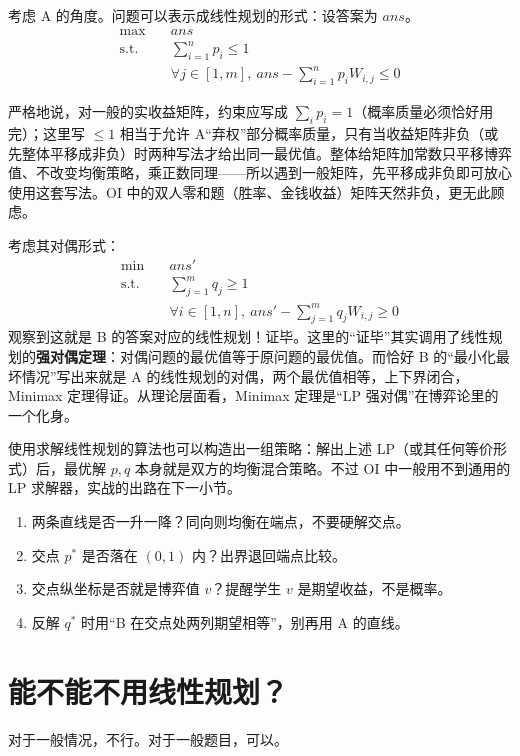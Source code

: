 考虑 A 的角度。问题可以表示成线性规划的形式：设答案为 $ans$。
\[
 \begin{aligned}
 \max\quad & ans\\
 \text{s.t.}\quad & \sum_{i=1}^{n}p_i\le1\\
 & \forall j\in[1,m],\ ans-\sum_{i=1}^{n}p_iW_{i,j}\le0
 \end{aligned}
\]

\begin{pitfall}[$\sum p_i\le1$ 还是 $\sum p_i=1$]
严格地说，对一般的实收益矩阵，约束应写成 $\sum_i p_i=1$（概率质量必须恰好用完）；这里写 $\le1$ 相当于允许 A“弃权”部分概率质量，只有当收益矩阵非负（或先整体平移成非负）时两种写法才给出同一最优值。整体给矩阵加常数只平移博弈值、不改变均衡策略，乘正数同理——所以遇到一般矩阵，先平移成非负即可放心使用这套写法。OI 中的双人零和题（胜率、金钱收益）矩阵天然非负，更无此顾虑。
\end{pitfall}

考虑其对偶形式：
\[
 \begin{aligned}
 \min\quad & ans'\\
 \text{s.t.}\quad & \sum_{j=1}^{m}q_j\ge1\\
 & \forall i\in[1,n],\ ans'-\sum_{j=1}^{m}q_jW_{i,j}\ge0
 \end{aligned}
\]
观察到这就是 B 的答案对应的线性规划！证毕。这里的“证毕”其实调用了线性规划的\textbf{强对偶定理}：对偶问题的最优值等于原问题的最优值。而恰好 B 的“最小化最坏情况”写出来就是 A 的线性规划的对偶，两个最优值相等，上下界闭合，Minimax 定理得证。从理论层面看，Minimax 定理是“LP 强对偶”在博弈论里的一个化身。

使用求解线性规划的算法也可以构造出一组策略：解出上述 LP（或其任何等价形式）后，最优解 $p,q$ 本身就是双方的均衡混合策略。不过 OI 中一般用不到通用的 LP 求解器，实战的出路在下一小节。

\begin{teach}[图解法的画图检查表]
\begin{enumerate}
\item 两条直线是否一升一降？同向则均衡在端点，不要硬解交点。
\item 交点 $p^*$ 是否落在 $(0,1)$ 内？出界退回端点比较。
\item 交点纵坐标是否就是博弈值 $v$？提醒学生 $v$ 是期望收益，不是概率。
\item 反解 $q^*$ 时用“B 在交点处两列期望相等”，别再用 A 的直线。
\end{enumerate}
\end{teach}
\section{能不能不用线性规划？}
对于一般情况，不行。对于一般题目，可以。

